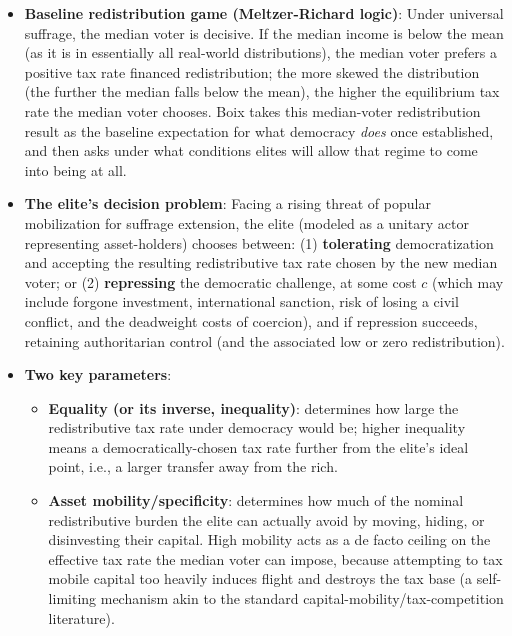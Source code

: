 \documentclass[12pt]{article}
\begin{document}
\begin{itemize}[leftmargin=*, itemsep=4pt]
    \item \textbf{Baseline redistribution game (Meltzer-Richard logic)}: Under universal suffrage, the median voter is decisive. If the median income is below the mean (as it is in essentially all real-world distributions), the median voter prefers a positive tax rate financed redistribution; the more skewed the distribution (the further the median falls below the mean), the higher the equilibrium tax rate the median voter chooses. Boix takes this median-voter redistribution result as the baseline expectation for what democracy \emph{does} once established, and then asks under what conditions elites will allow that regime to come into being at all.
    \item \textbf{The elite's decision problem}: Facing a rising threat of popular mobilization for suffrage extension, the elite (modeled as a unitary actor representing asset-holders) chooses between: (1) \textbf{tolerating} democratization and accepting the resulting redistributive tax rate chosen by the new median voter; or (2) \textbf{repressing} the democratic challenge, at some cost $c$ (which may include forgone investment, international sanction, risk of losing a civil conflict, and the deadweight costs of coercion), and if repression succeeds, retaining authoritarian control (and the associated low or zero redistribution).
    \item \textbf{Two key parameters}:
        \begin{itemize}
            \item \textbf{Equality (or its inverse, inequality)}: determines how large the redistributive tax rate under democracy would be; higher inequality means a democratically-chosen tax rate further from the elite's ideal point, i.e., a larger transfer away from the rich.
            \item \textbf{Asset mobility/specificity}: determines how much of the nominal redistributive burden the elite can actually avoid by moving, hiding, or disinvesting their capital. High mobility acts as a de facto ceiling on the effective tax rate the median voter can impose, because attempting to tax mobile capital too heavily induces flight and destroys the tax base (a self-limiting mechanism akin to the standard capital-mobility/tax-competition literature).
        \end{itemize}

\end{itemize}
\end{document}
